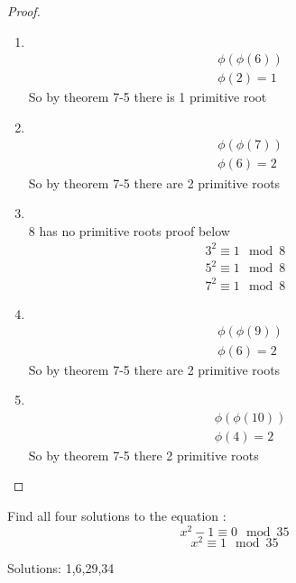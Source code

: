 \documentclass[11pt]{article}
\theoremstyle{definition}  %
\newcommand{\block}[2]{\begin{tcolorbox}[title={#1}]{#2}\end{tcolorbox}}
\begin{document}
\begin{proof}
\begin{enumerate}
  \item \\
  \begin{align*}
    &\phi(\phi(6))\\
    &\phi(2)=1
  \end{align*}
  So by theorem 7-5 there is 1 primitive root
  \item \\
  \begin{align*}
    &\phi(\phi(7))\\
    &\phi(6)=2
  \end{align*}
  So by theorem 7-5 there are 2 primitive roots
  \item \\
  8 has no primitive roots proof below
  \begin{align*}
    3^2\equiv 1\mod8\\
    5^2\equiv 1\mod8\\
    7^2\equiv 1\mod8
  \end{align*}
  \item \\
  \begin{align*}
    &\phi(\phi(9))\\
    &\phi(6)=2
  \end{align*}
  So by theorem 7-5 there are 2 primitive roots
  \item \\
  \begin{align*}
    &\phi(\phi(10))\\
    &\phi(4)=2
  \end{align*}
  So by theorem 7-5 there  2 primitive roots
\end{enumerate}

\end{proof}
\block{Question #5: Stein 2.23}{
Find all four solutions to the equation : \
\[
    x^2-1\equiv 0 \mod 35
\]
\[
    x^2\equiv 1 \mod 35
\]
}
Solutions: 1,6,29,34
\end{document}
